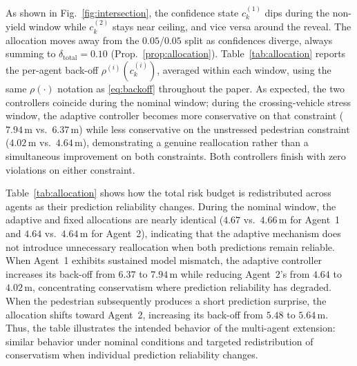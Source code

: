 \documentclass[letterpaper, 10 pt, conference]{ieeeconf}
\begin{document}
As shown in Fig.~\ref{fig:intersection}, the confidence state $c_k^{(1)}$ dips during the non-yield window while $c_k^{(2)}$ stays near ceiling, and vice versa around the reveal. The allocation moves away from the $0.05$/$0.05$ split as confidences diverge, always summing to $\delta_{\mathrm{total}}=0.10$ (Prop.~\ref{prop:allocation}). Table~\ref{tab:allocation} reports the per-agent back-off $\rho^{(i)}(c_k^{(i)})$, averaged within each window, using the same $\rho(\cdot)$ notation as \eqref{eq:backoff} throughout the paper. As expected, the two controllers coincide during the nominal window; during the crossing-vehicle stress window, the adaptive controller becomes more conservative on that constraint ($7.94\,\mathrm{m}$ vs.\ $6.37\,\mathrm{m}$) while less conservative on the unstressed pedestrian constraint ($4.02\,\mathrm{m}$ vs.\ $4.64\,\mathrm{m}$), demonstrating a genuine reallocation rather than a simultaneous improvement on both constraints. Both controllers finish with zero violations on either constraint.


\begin{table}[t]
\centering
\caption{Per-agent back-off $\rho^{(i)}$ [m] by operating window for Scenario C ($\delta_{\mathrm{total}}=0.10$).}
\label{tab:allocation}
\small
{}
\end{table}
Table~\ref{tab:allocation} shows how the total risk budget is redistributed across agents as their prediction reliability changes. During the nominal window, the adaptive and fixed allocations are nearly identical ($4.67$ vs.\ $4.66\,\mathrm{m}$ for Agent~1 and $4.64$ vs.\ $4.64\,\mathrm{m}$ for Agent~2), indicating that the adaptive mechanism does not introduce unnecessary reallocation when both predictions remain reliable. When Agent~1 exhibits sustained model mismatch, the adaptive controller increases its back-off from $6.37$ to $7.94\,\mathrm{m}$ while reducing Agent~2's from $4.64$ to $4.02\,\mathrm{m}$, concentrating conservatism where prediction reliability has degraded. When the pedestrian subsequently produces a short prediction surprise, the allocation shifts toward Agent~2, increasing its back-off from $5.48$ to $5.64\,\mathrm{m}$. Thus, the table illustrates the intended behavior of the multi-agent extension: similar behavior under nominal conditions and targeted redistribution of conservatism when individual prediction reliability changes.
\end{document}
